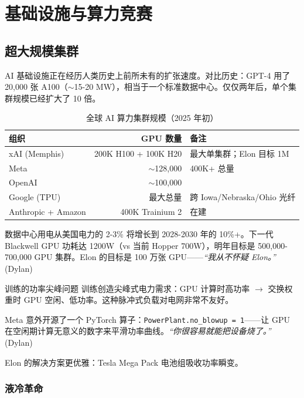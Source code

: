 \documentclass[a4paper]{article}
\begin{document}
\section{基础设施与算力竞赛}

\subsection{超大规模集群}

AI 基础设施正在经历人类历史上前所未有的扩张速度。对比历史：GPT-4 用了 20,000 张 A100（$\sim$15-20 MW），相当于一个标准数据中心。仅仅两年后，单个集群规模已经扩大了 10 倍。

\begin{table}[H]
\centering
\begin{tabular}{lrl}
\toprule
\textbf{组织} & \textbf{GPU 数量} & \textbf{备注} \\
\midrule
xAI (Memphis) & 200K H100 + 100K H20 & 最大单集群；Elon 目标 1M \\
Meta & $\sim$128,000 & 400K+ 总量 \\
OpenAI & $\sim$100,000 & \\
Google (TPU) & 最大总量 & 跨 Iowa/Nebraska/Ohio 光纤 \\
Anthropic + Amazon & 400K Trainium 2 & 在建 \\
\bottomrule
\end{tabular}
\caption{全球 AI 算力集群规模（2025 年初）}
\end{table}

数据中心用电从美国电力的 2-3\% 将增长到 2028-2030 年的 10\%+。下一代 Blackwell GPU 功耗达 1200W（vs 当前 Hopper 700W），明年目标是 500,000-700,000 GPU 集群。Elon 的目标是 100 万张 GPU——\textit{``我从不怀疑 Elon。''} (Dylan)

\begin{knowledgebox}{训练的功率尖峰问题}
训练创造尖峰式电力需求：GPU 计算时高功率 $\to$ 交换权重时 GPU 空闲、低功率。这种脉冲式负载对电网非常不友好。

Meta 意外开源了一个 PyTorch 算子：\texttt{PowerPlant.no\_blowup = 1}——让 GPU 在空闲期计算无意义的数字来平滑功率曲线。\textit{``你很容易就能把设备烧了。''} (Dylan)

Elon 的解决方案更优雅：Tesla Mega Pack 电池组吸收功率瞬变。
\end{knowledgebox}

\subsubsection{液冷革命}
\end{document}
